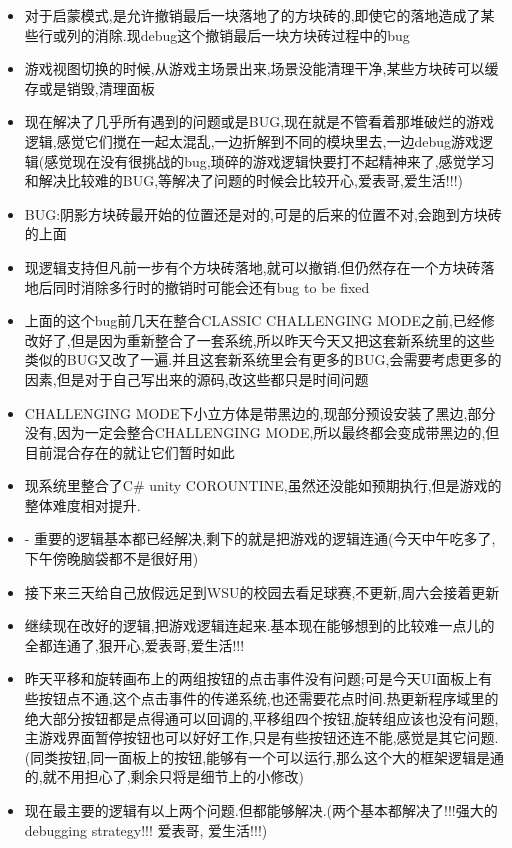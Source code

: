 \documentclass[9pt, b5paper]{article}
\begin{document}
\begin{itemize}
\item 对于启蒙模式,是允许撤销最后一块落地了的方块砖的,即使它的落地造成了某些行或列的消除.现debug这个撤销最后一块方块砖过程中的bug
\item 游戏视图切换的时候,从游戏主场景出来,场景没能清理干净,某些方块砖可以缓存或是销毁,清理面板
\item 现在解决了几乎所有遇到的问题或是BUG,现在就是不管看着那堆破烂的游戏逻辑,感觉它们搅在一起太混乱,一边折解到不同的模块里去,一边debug游戏逻辑(感觉现在没有很挑战的bug,琐碎的游戏逻辑快要打不起精神来了,感觉学习和解决比较难的BUG,等解决了问题的时候会比较开心,爱表哥,爱生活!!!)
\item BUG:阴影方块砖最开始的位置还是对的,可是的后来的位置不对,会跑到方块砖的上面
\item 现逻辑支持但凡前一步有个方块砖落地,就可以撤销.但仍然存在一个方块砖落地后同时消除多行时的撤销时可能会还有bug to be fixed
\item 上面的这个bug前几天在整合CLASSIC CHALLENGING MODE之前,已经修改好了,但是因为重新整合了一套系统,所以昨天今天又把这套新系统里的这些类似的BUG又改了一遍.并且这套新系统里会有更多的BUG,会需要考虑更多的因素,但是对于自己写出来的源码,改这些都只是时间问题
\item CHALLENGING MODE下小立方体是带黑边的,现部分预设安装了黑边,部分没有,因为一定会整合CHALLENGING MODE,所以最终都会变成带黑边的,但目前混合存在的就让它们暂时如此
\item 现系统里整合了C\# unity COROUNTINE,虽然还没能如预期执行,但是游戏的整体难度相对提升.
\item - 重要的逻辑基本都已经解决,剩下的就是把游戏的逻辑连通(今天中午吃多了,下午傍晚脑袋都不是很好用)
\item 接下来三天给自己放假远足到WSU的校园去看足球赛,不更新,周六会接着更新
\item 继续现在改好的逻辑,把游戏逻辑连起来.基本现在能够想到的比较难一点儿的全都连通了,狠开心,爱表哥,爱生活!!!
\item 昨天平移和旋转画布上的两组按钮的点击事件没有问题;可是今天UI面板上有些按钮点不通,这个点击事件的传递系统,也还需要花点时间.热更新程序域里的绝大部分按钮都是点得通可以回调的,平移组四个按钮,旋转组应该也没有问题,主游戏界面暂停按钮也可以好好工作,只是有些按钮还连不能,感觉是其它问题. (同类按钮,同一面板上的按钮,能够有一个可以运行,那么这个大的框架逻辑是通的,就不用担心了,剩余只将是细节上的小修改)
\item 现在最主要的逻辑有以上两个问题.但都能够解决.(两个基本都解决了!!!强大的debugging strategy!!! 爱表哥, 爱生活!!!)
\begin{itemize}

\end{itemize}
\end{itemize}
\end{document}
